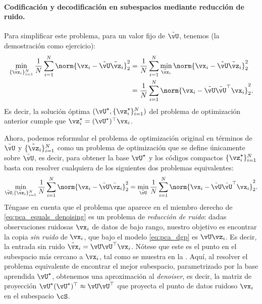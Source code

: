 \documentclass[../../book-main.tex]{subfiles}
\begin{document}
\paragraph{Codificación y decodificación en subespacios mediante reducción de ruido.}
Para simplificar este problema, para un valor fijo de \(\tilde{\vU}\), tenemos (la demostración
como ejercicio):
\begin{align}
    \min_{\{\tilde{\vz}_{i}\}_{i = 1}^{N}}\frac{1}{N}\sum_{i =
    1}^{N}\norm{\vx_{i} - \tilde{\vU}\tilde{\vz}_{i}}_{2}^{2}
    &= \frac{1}{N}\sum_{i = 1}^{N}\min_{\tilde{\vz}_{i}}\norm{\vx_{i}
    - \tilde{\vU}\tilde{\vz}_{i}}_{2}^{2} \\
    &= \frac{1}{N}\sum_{i = 1}^{N}\norm{\vx_{i} -
    \tilde{\vU}\tilde{\vU}^{\top}\vx_{i}}_{2}^{2}.
\end{align}
Es decir, la solución óptima \((\vU^{\star}, \{\vz_{i}^{\star}\}_{i = 1}^{N})\)
del problema de optimización anterior cumple que $\vz_i^{\star} = (\vU^{\star})^\top\vx_i$.

Ahora, podemos reformular el problema de optimización original en términos de \(\tilde{\vU}\)
y \(\{\tilde{\vz}_{i}\}_{i = 1}^{N}\) como un problema de optimización que se define únicamente sobre
\(\tilde{\vU}\), es decir, para obtener la base \(\vU^{\star}\) y los códigos compactos
\(\{\vz_{i}^{\star}\}_{i = 1}^{N}\) basta con resolver cualquiera de
los siguientes dos problemas equivalentes:
\begin{equation}\label{eq:pca_equals_denoising}
    \min_{\tilde{\vU}, \{\tilde{\vz}_{i}\}_{i =
    1}^{N}}\frac{1}{N}\sum_{i = 1}^{N}\norm{\vx_{i} -
    \tilde{\vU}\tilde{\vz}_{i}}_{2}^{2} =
    \min_{\tilde{\vU}}\frac{1}{N}\sum_{i = 1}^{N}\norm{\vx_{i} -
    \tilde{\vU}\tilde{\vU}^{\top}\vx_{i}}_{2}^{2}.
\end{equation}
Téngase en cuenta que el problema que aparece en el miembro derecho de \eqref{eq:pca_equals_denoising}
es un problema de \textit{reducción de ruido}: dadas observaciones ruidosas \(\vx_{i}\) de
datos de bajo rango, nuestro objetivo es encontrar la copia \textit{sin ruido} de \(\vx_{i}\), que
bajo el modelo \eqref{eq:pca_dgp} es $\vU\vz_{i}$. Es decir, la entrada sin ruido
$\hat{\vx}_i = \vU\vU^\top \vx_i$. Nótese que este es el punto en el subespacio
más cercano a $\vx_i$, tal como se muestra en la .
Aquí, al resolver el problema equivalente de encontrar el mejor subespacio, parametrizado por
la base aprendida \(\vU^{\star}\), obtenemos una aproximación al \textit{denoiser}, es decir, 
la matriz de proyección \(\vU^{\star}(\vU^{\star})^{\top} \approx \vU\vU^{\top}\) que
proyecta el punto de datos ruidoso $\vx_i$ en el subespacio \(\cS\). %
\end{document}
